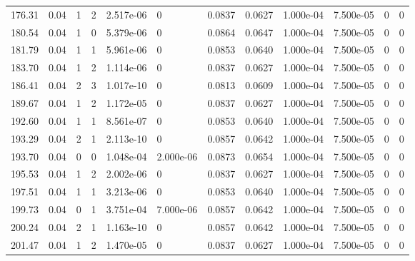 \documentclass[preview]{standalone}
\begin{document}
{{{\begin{tabular}{L{1.2cm}C{1.2cm} C{0.3cm}C{0.5cm} C{1.4cm}C{1.4cm} C{1.4cm}C{1.4cm} C{1.6cm}C{1.6cm} C{1.6cm}C{1.6cm}}
  176.31  &  0.04  & 1     &  2 &  2.517e-06  & 0  &  0.0837&   0.0627& 1.000e-04 & 7.500e-05   &  0 & 0  \\ 
  180.54  &  0.04  & 1     &  0 &  5.379e-06  & 0  &  0.0864&   0.0647& 1.000e-04 & 7.500e-05   &  0 & 0  \\ 
  181.79  &  0.04  & 1     &  1 &  5.961e-06  & 0  &  0.0853&   0.0640& 1.000e-04 & 7.500e-05   &  0 & 0  \\ 
  183.70  &  0.04  & 1     &  2 &  1.114e-06  & 0  &  0.0837&   0.0627& 1.000e-04 & 7.500e-05   &  0 & 0  \\ 
  186.41  &  0.04  & 2     &  3 &  1.017e-10  & 0  &  0.0813&   0.0609& 1.000e-04 & 7.500e-05   &  0 & 0  \\ 
  189.67  &  0.04  & 1     &  2 &  1.172e-05  & 0  &  0.0837&   0.0627& 1.000e-04 & 7.500e-05   &  0 & 0  \\ 
  192.60  &  0.04  & 1     &  1 &  8.561e-07  & 0  &  0.0853&   0.0640& 1.000e-04 & 7.500e-05   &  0 & 0  \\ 
  193.29  &  0.04  & 2     &  1 &  2.113e-10  & 0  &  0.0857&   0.0642& 1.000e-04 & 7.500e-05   &  0 & 0  \\ 
  193.70  &  0.04  & 0     &  0 &  1.048e-04  & 2.000e-06  &  0.0873&   0.0654& 1.000e-04 & 7.500e-05   &  0 & 0  \\ 
  195.53  &  0.04  & 1     &  2 &  2.002e-06  & 0  &  0.0837&   0.0627& 1.000e-04 & 7.500e-05   &  0 & 0  \\ 
  197.51  &  0.04  & 1     &  1 &  3.213e-06  & 0  &  0.0853&   0.0640& 1.000e-04 & 7.500e-05   &  0 & 0  \\ 
  199.73  &  0.04  & 0     &  1 &  3.751e-04  & 7.000e-06  &  0.0857&   0.0642& 1.000e-04 & 7.500e-05   &  0 & 0  \\ 
  200.24  &  0.04  & 2     &  1 &  1.163e-10  & 0  &  0.0857&   0.0642& 1.000e-04 & 7.500e-05   &  0 & 0  \\ 
  201.47  &  0.04  & 1     &  2 &  1.470e-05  & 0  &  0.0837&   0.0627& 1.000e-04 & 7.500e-05   &  0 & 0  \\ 
\hline 
\end{tabular} 

}}}
\end{document}
